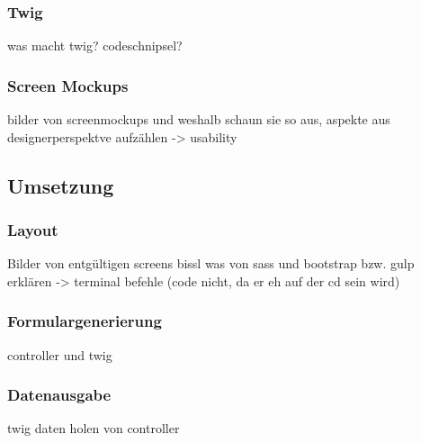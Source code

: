     \subsubsection{Twig}

was macht twig? codeschnipsel?

    \subsubsection{Screen Mockups}

bilder von screenmockups und weshalb schaun sie so aus, aspekte aus designerperspektve aufzählen -> usability

  \subsection{Umsetzung}

    \subsubsection{Layout}

Bilder von entgültigen screens
bissl was von sass und bootstrap bzw. gulp erklären -> terminal befehle (code nicht, da er eh auf der cd sein wird)

    \subsubsection{Formulargenerierung}

controller und twig

    \subsubsection{Datenausgabe}

twig daten holen von controller
